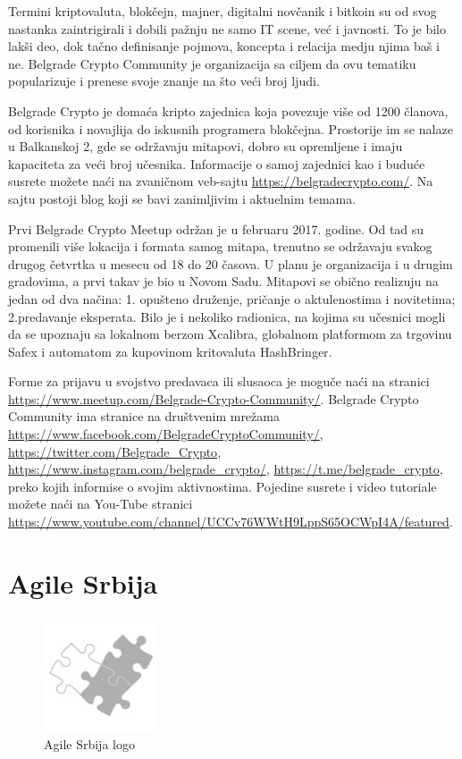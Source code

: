 \documentclass[a4paper]{article}
\begin{document}
{Termini  kriptovaluta, blokčejn, majner, digitalni novčanik i bitkoin su od svog nastanka zaintrigirali i dobili pažnju ne samo IT scene, već i javnosti. To je bilo lakši deo, dok tačno definisanje pojmova, koncepta i relacija medju njima baš i ne. Belgrade Crypto Community je organizacija sa ciljem da ovu tematiku popularizuje i prenese svoje znanje na što veći broj ljudi.

Belgrade Crypto je domaća kripto zajednica koja povezuje više od 1200 članova, od korisnika i novajlija do iskusnih programera blokčejna. Prostorije im se nalaze u Balkanskoj 2, gde se održavaju mitapovi, dobro su opremljene i imaju kapaciteta za veći broj učesnika. Informacije o samoj zajednici kao i buduće susrete možete naći na zvaničnom veb-sajtu \url{https://belgradecrypto.com/}. Na sajtu postoji blog koji se bavi zanimljivim i aktuelnim temama.

Prvi Belgrade Crypto Meetup održan je u februaru 2017. godine. Od tad su promenili više lokacija i formata samog mitapa, trenutno se održavaju svakog drugog četvrtka u mesecu od 18 do 20 časova. U planu je organizacija i u drugim gradovima, a prvi takav je bio u Novom Sadu. Mitapovi se obično realizuju na jedan od dva načina: 1. opušteno druženje, pričanje o aktulenostima i novitetima; 2.predavanje eksperata. Bilo je i nekoliko radionica, na kojima su učesnici mogli  da se upoznaju sa lokalnom berzom Xcalibra, globalnom platformom za trgovinu Safex i automatom za kupovinom kritovaluta HashBringer. 

Forme za prijavu u svojstvo predavaca ili slusaoca je moguče naći na stranici \url{https://www.meetup.com/Belgrade-Crypto-Community/}. Belgrade Crypto Community ima stranice na društvenim mrežama \url{https://www.facebook.com/BelgradeCryptoCommunity/}, \url{https://twitter.com/Belgrade_Crypto}, \url{https://www.instagram.com/belgrade_crypto/}, \url{https://t.me/belgrade_crypto}, preko kojih informise o svojim aktivnostima. Pojedine susrete i video tutoriale možete naći na You-Tube stranici \url{https://www.youtube.com/channel/UCCv76WWtH9LppS65OCWpI4A/featured}.


\section{Agile Srbija}
\label{sec:agsrb}

\begin{figure}[h]
  \centering
  \includegraphics[width=0.3\textwidth]{agile_srb_grey.png}
  \caption{Agile Srbija logo}
\end{figure}

}
\end{document}
